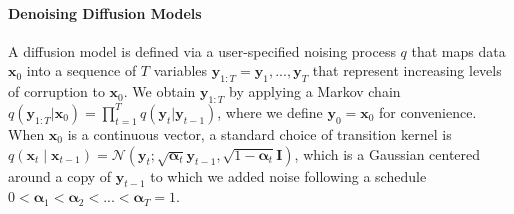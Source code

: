 \documentclass[letterpaper]{article} %
\newcommand{\bx}{\mathbf{x}}
\newcommand{\bz}{\mathbf{z}}
\newcommand{\by}{\mathbf{y}}
\let\oldalpha\alpha
\renewcommand{\alpha}{{\boldsymbol \oldalpha}}
\begin{document}

\paragraph{Denoising Diffusion Models}

A diffusion model is defined via a user-specified noising process $q$ that maps data $\bx_0$ into a sequence of $T$ variables $\by_{1:T} = \by_1, ..., \by_T$ that represent increasing levels of corruption to $\bx_0$. We obtain $\by_{1:T}$ by applying a Markov chain
$q(\by_{1:T} | \bx_0) = \prod_{t=1}^T q(\by_t | \by_{t-1})$, where we define $\by_0 = \bx_0$ for convenience.
When $\bx_0$ is a continuous vector, a standard choice of transition kernel is $q(\bx_t \mid \bx_{t-1}) = \mathcal{N}(\by_t; \sqrt{\alpha_t} \by_{t-1}, \sqrt{1-\alpha_t} \mathbf{I})$, which is a Gaussian centered around a copy of $\by_{t-1}$ to which we added noise following a schedule $0<\alpha_1 < \alpha_2 < ... < \alpha_T=1$.
\end{document}
